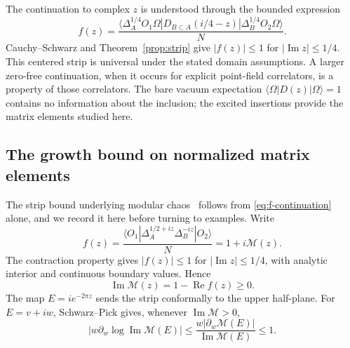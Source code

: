 \documentclass[a4paper,11pt]{article}
\theoremstyle{definition}
\begin{document}
The continuation to complex $z$ is understood through the bounded expression
\begin{equation}
 f(z)=\frac{\langle\Delta_A^{1/4}O_1\Omega|D_{B\subset A}(i/4-z)|\Delta_B^{1/4}O_2\Omega\rangle}{N}.
 \label{eq:f-continuation}
\end{equation}
Cauchy--Schwarz and Theorem~\ref{prop:strip} give $|f(z)|\le1$ for $|\operatorname{Im}z|\le1/4$. This centered strip is universal under the stated domain assumptions. A larger zero-free continuation, when it occurs for explicit point-field correlators, is a property of those correlators. The bare vacuum expectation $\langle\Omega|D(z)|\Omega\rangle=1$ contains no information about the inclusion; the excited insertions provide the matrix elements studied here.

\subsection{The growth bound on normalized matrix elements}\label{subsec:modular-chaos-bound}

The strip bound underlying modular chaos~\cite{deBoerLamprou2020} follows from \eqref{eq:f-continuation} alone, and we record it here before turning to examples. Write
\begin{equation}
 f(z)=\frac{\langle O_1|\Delta_A^{1/2+iz}\Delta_B^{-iz}|O_2\rangle}{N}=1+i\mathcal M(z).
 \label{eq:normalized-characteristic}
\end{equation}
The contraction property gives $|f(z)|\le1$ for $|\operatorname{Im}z|\le1/4$, with analytic interior and continuous boundary values. Hence
\begin{equation}
 \operatorname{Im}\mathcal M(z)=1-\operatorname{Re}f(z)\ge0 .
 \label{eq:positive-imaginary-part}
\end{equation}
The map $E=ie^{-2\pi z}$ sends the strip conformally to the upper half-plane. For $E=v+iw$, Schwarz--Pick gives, whenever $\operatorname{Im}\mathcal M>0$,
\begin{equation}
 \left|w\partial_w\log\operatorname{Im}\mathcal M(E)\right|
 \le\frac{w|\partial_w\mathcal M(E)|}{\operatorname{Im}\mathcal M(E)}\le1 .
 \label{eq:exact-modular-chaos-bound}
\end{equation}
\end{document}
